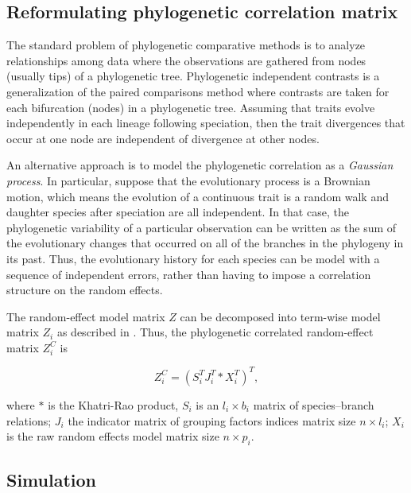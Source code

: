 
\subsection{Reformulating phylogenetic correlation matrix}
The standard problem of phylogenetic comparative methods is to analyze relationships among data where the observations are gathered from nodes (usually tips) of a phylogenetic tree.
Phylogenetic independent contrasts is a generalization of the paired comparisons method where contrasts are taken for each bifurcation (nodes) in a phylogenetic tree. 
Assuming that traits evolve independently in each lineage following speciation, then the trait divergences that occur at one node are independent of divergence at other nodes.  

An alternative approach is to model the phylogenetic correlation as a \textit{Gaussian process}. 
In particular, suppose that the evolutionary process is a Brownian motion, which means the evolution of a continuous trait is a random walk and daughter species after speciation are all independent.  
In that case, the phylogenetic variability of a particular observation can be written as the sum of the evolutionary changes that occurred on all of the branches in the phylogeny in its past. 
Thus, the evolutionary history for each species can be model with a sequence of independent errors, rather than having to impose a correlation structure on the random effects. 

The random-effect model matrix $Z$ can be decomposed into term-wise model matrix $Z_{i}$ as described in .
Thus, the phylogenetic correlated random-effect matrix $Z^{C}_{i}$ is

\begin{equation}
Z^{C}_{i} = (S^{T}_{i}J^{T}_{i} \ast X^{T}_{i})^{T},
\end{equation}


where $\ast$ is the Khatri-Rao product, $S_{i}$ is an $l_{i} \times b_{i}$ matrix of species--branch relations; $J_{i}$ the indicator matrix of grouping factors indices matrix size $n \times l_{i}$; $X_{i}$ is the raw random effects model matrix size $n \times p_{i}$.



\subsection{Simulation}


